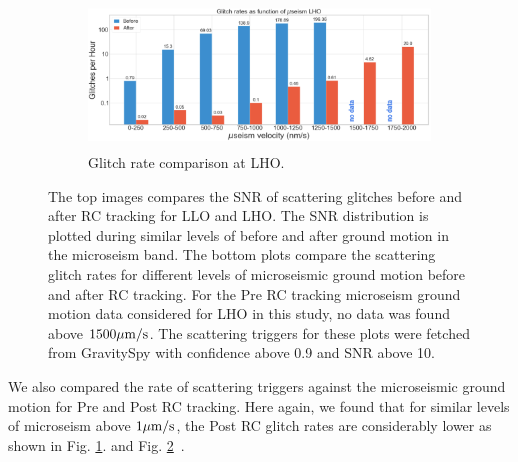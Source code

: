 \documentclass[12pt]{iopart}
\begin{document}
\begin{figure}[h]
\begin{subfigure}[b]{0.45\textwidth}
         \label{fig:rate_LLO}
    \end{subfigure}
    \hfill
    \begin{subfigure}[b]{0.45\textwidth}
        \centering
         \includegraphics[width =\textwidth,height=3.9cm]{glitch_rateLHO.png}
         \caption{Glitch rate comparison at LHO.}
         \label{fig:rate_LHO}
    \end{subfigure}
    
    
    
    \caption{The top images compares the SNR of scattering glitches before and after RC tracking for LLO and LHO. The  SNR distribution is plotted during similar levels of before and after ground motion in the microseism band. The bottom plots compare the scattering glitch rates for different levels of microseismic ground motion before and after RC tracking. For the Pre RC tracking microseism ground motion data considered for LHO in this study, no data was found above $1500\mu{\rm m/s}$. The scattering triggers for these plots were fetched from GravitySpy with confidence above 0.9 and SNR above 10.} %
    \label{fig:postr0_scat}
    
\end{figure}
We also compared the rate of scattering triggers against the microseismic ground motion for Pre and Post RC tracking. Here again, we found that for similar levels of microseism above $1\mu{\rm m/s}$, the Post RC glitch rates are considerably lower as shown in Fig. \ref{fig:rate_LLO}. and Fig. \ref{fig:rate_LHO}~\cite{alog_corey}.
\end{document}
